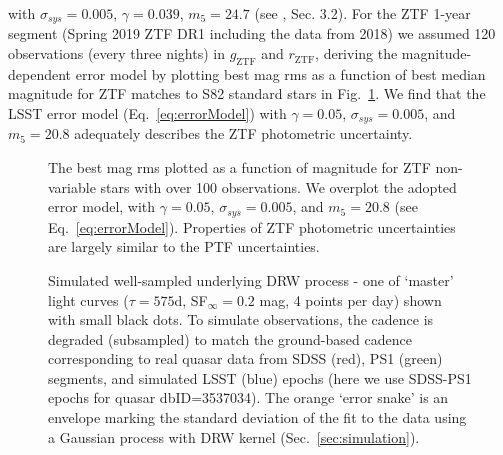 \documentclass[twocolumn]{aastex62}
\begin{document}
with  $\sigma_{sys} = 0.005$, $\gamma=0.039$, $m_{5} = 24.7$ (see \citealt{ivezic2019}, Sec. 3.2).
For the ZTF 1-year segment (Spring 2019 ZTF DR1 including the data from 2018) we assumed 120 observations (every three nights) in $g_{\mathrm{ZTF}}$ and $r_{\mathrm{ZTF}}$, deriving the magnitude-dependent error model by plotting best mag rms as a function of best median magnitude for ZTF matches to S82 standard stars in Fig.~\ref{fig:ztf_errors}. We find that the LSST error model (Eq.~\ref{eq:errorModel}) with $\gamma = 0.05$, $\sigma_{sys} = 0.005 $, and $m_{5} = 20.8$ adequately describes the ZTF photometric uncertainty. 


\begin{figure}%
	\caption{The best mag rms plotted as a function of magnitude for ZTF non-variable stars with over 100 observations. We overplot the adopted error model, with $\gamma = 0.05$, $\sigma_{sys} = 0.005 $, and $m_{5} = 20.8$ (see Eq.~\ref{eq:errorModel}). Properties of ZTF photometric uncertainties are largely similar to the PTF uncertainties.}
	\label{fig:ztf_errors}
\end{figure} 


\begin{figure*}%
	\caption{Simulated well-sampled underlying DRW process - one of `master' light curves ($\tau=575$d, SF$_{\infty} = 0.2$ mag, 4 points per day) shown with  small black dots. To simulate observations, the cadence is degraded (subsampled) to match the ground-based cadence corresponding to real quasar data from SDSS (red), PS1 (green) segments, and simulated LSST (blue) epochs (here we use SDSS-PS1 epochs for quasar dbID=3537034). The orange `error snake' is an envelope marking the standard deviation of the fit to the data using a Gaussian process  with DRW kernel (Sec.~\ref{sec:simulation}).}
	\label{fig:lc_simulated}
\end{figure*} 
\end{document}
